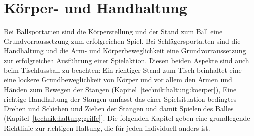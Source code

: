 \section{Körper- und Handhaltung}
\label{technik:haltung}

Bei Ballsportarten sind die Körperstellung und der Stand zum Ball eine Grundvorraussetzung zum erfolgreichen Spiel.
Bei Schlägersportarten sind die Handhaltung und die Arm- und Körperbeweglichkeit eine Grundvorraussetzung zur erfolgreichen Ausführung einer Spielaktion.
Diesen beiden Aspekte sind auch beim Tischfussball zu beachten:
Ein richtiger Stand zum Tisch beinhaltet eine eine lockere Grundbeweglichkeit von Körper und vor allem den Armen und Händen zum Bewegen der Stangen (Kapitel~\ref{technik:haltung:koerper}),
Eine richtige Handhaltung der Stangen umfasst das einer Spielsituation bedingtes Drehen und Schieben und Ziehen der Stangen und damit Spielen des Balles (Kapitel~\ref{technik:haltung:griffe}).
Die folgenden Kapitel geben eine grundlegende Richtlinie zur richtigen Haltung, die für jeden individuell anders ist. 

